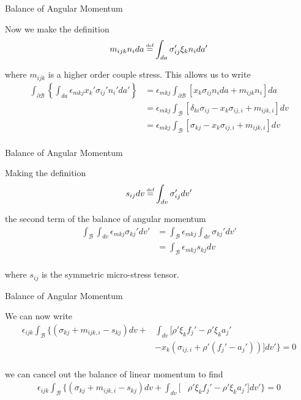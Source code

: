 \documentclass[11pt]{beamer}
\newcommand\defeq{\mathrel{\stackrel{\makebox[0pt]{\mbox{\normalfont\tiny def}}}{=}}}
\begin{document}
\begin{frame}{Balance of Angular Momentum}

Now we make the definition
\begin{align*}
m_{ijk}n_i da &\defeq \int_{da} \sigma_{ij}' \xi_k n_i da'\\
\end{align*}

where $m_{ijk}$ is a higher order couple stress. This allows us to write
\begin{align*}
\int_{\partial \mathcal{B}} \left\{\int_{da} \epsilon_{mkj} x_k' \sigma_{ij}' n_i' da'\right\} &= \epsilon_{mkj} \int_{\partial \mathcal{B}} \left[x_k \sigma_{ij} n_i da +  m_{ijk} n_i \right]da\\
&= \epsilon_{mkj}\int_{\mathcal{B}} \left[\delta_{ki}\sigma_{ij} - x_k \sigma_{ij,i} + m_{ijk,i}\right] dv\\
&= \epsilon_{mkj}\int_{\mathcal{B}} \left[\sigma_{kj} - x_k \sigma_{ij,i} + m_{ijk,i}\right] dv\\
\end{align*}

\end{frame}

\begin{frame}{Balance of Angular Momentum}

Making the definition
\begin{align*}
s_{ij} dv &\defeq \int_{dv} \sigma_{ij}' dv'\\
\end{align*}

the second term of the balance of angular momentum
\begin{align*}
\int_{\mathcal{B}} \int_{dv}  \epsilon_{mkj} \sigma_{kj}' dv' &= \int_{\mathcal{B}} \epsilon_{mkj} \int_{dv} \sigma_{kj}' dv'\\
&= \int_{\mathcal{B}} \epsilon_{mkj} s_{kj} dv\\
\end{align*}

where $s_{ij}$ is the symmetric micro-stress tensor.
\end{frame}

\begin{frame}{Balance of Angular Momentum}

We can now write
\begin{align*}
\epsilon_{ijk}\int_{\mathcal{B}} \bigg\{\left(\sigma_{kj} + m_{ijk,i} - s_{kj}\right) dv + &\int_{dv}\big[\rho' \xi_k f_j'-\rho' \xi_k a_j'\\
&- x_k \left(\sigma_{ij,i} + \rho' \left(f_j' - a_j'\right)\right) \big] dv'\bigg\} = 0\\
\end{align*}

we can cancel out the balance of linear momentum to find
\begin{align*}
\epsilon_{ijk}\int_{\mathcal{B}} \bigg\{\left(\sigma_{kj} + m_{ijk,i} - s_{kj}\right)dv + \int_{dv}\big[&\rho' \xi_k f_j'-\rho' \xi_k a_j' \big]dv'\bigg\} = 0\\
\end{align*}

\end{frame}
\end{document}
